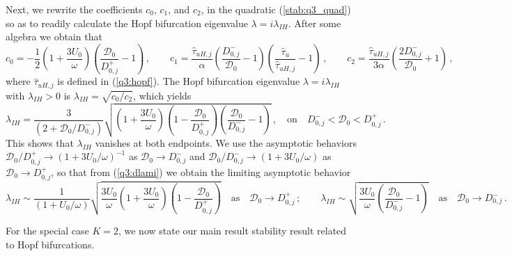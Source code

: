\documentclass{article}%
\newcommand{\dzjp}{D^{+}_{0,j}}
\newcommand{\dzjm}{D^{-}_{0,j}}
\begin{document}
Next, we rewrite the coefficients $c_0$, $c_1$, and $c_2$, in the
quadratic (\ref{stab:q3_quad}) so as to readily calculate the Hopf
bifurcation eigenvalue $\lambda=i\lambda_{IH}$. After some algebra we
obtain that
\begin{equation}\label{q3:new_c0c1c2}
  c_0 = -\frac{1}{2}\left(1+\frac{3U_0}{\omega}\right)
   \left( \frac{{\mathcal D}_0}{\dzjp}-1\right) \,, \qquad
  c_1 = \frac{\hat{\tau}_{uH,j}}{\alpha} \left( \frac{\dzjm}{{\mathcal D}_0}
  -1 \right)\left( \frac{\hat{\tau}_u}{\hat{\tau}_{uH,j}} -1 \right) \,,
  \qquad c_2 = \frac{\hat{\tau}_{uH,j}}{3\alpha}
  \left(\frac{2\dzjm}{{\mathcal D}_0} + 1 \right) \,,
\end{equation}
where $\hat{\tau}_{uH,j}$ is defined in (\ref{q3:hopf}). The Hopf bifurcation
eigenvalue $\lambda=i\lambda_{IH}$ with $\lambda_{IH}>0$ is 
$\lambda_{IH}=\sqrt{c_0/c_2}$, which yields
\begin{equation}\label{q3:dlami}
   \lambda_{IH}=\frac{3}{\left(2 + {{\mathcal D}_0/\dzjm}\right)} 
  \sqrt{ \left( 1 + \frac{3U_0}{\omega}\right) 
    \left(1 - \frac{{\mathcal D}_0}{\dzjp}\right)
\left(\frac{{\mathcal D}_0}{\dzjm} -1 \right)}\,, \quad \mbox{on} \quad
   \dzjm < {\mathcal D}_0 < \dzjp \,.
\end{equation}
This shows that $\lambda_{IH}$ vanishes at both endpoints.  We use the
asymptotic behaviors ${{\mathcal D}_0/\dzjp}\to
\left(1+{3U_0/\omega}\right)^{-1}$ as ${\mathcal D}_0\to \dzjm$ and
${{\mathcal D}_0/\dzjm}\to \left(1+{3U_0/\omega}\right)$ as ${\mathcal
  D}_0\to \dzjp$, so that from (\ref{q3:dlami}) we obtain the limiting
asymptotic behavior
\begin{equation}\label{q3:lim_val}
   \lambda_{IH}\sim \frac{1}{\left(1 + {U_0/\omega}\right)}
  \sqrt{ \frac{3U_0}{\omega} \left( 1 + \frac{3U_0}{\omega}\right) 
    \left(1 - \frac{{\mathcal D}_0}{\dzjp}\right)} \quad \mbox{as}
 \quad {\mathcal D}_0\to \dzjp\,; \qquad
  \lambda_{IH}\sim \sqrt{ \frac{3U_0}{\omega} 
  \left( \frac{{\mathcal D}_0}{\dzjm}-1\right)} \quad \mbox{as} \quad
  {\mathcal D}_0\to \dzjm \,.
\end{equation}

\noindent For the special case $K=2$, we now state our main result stability
result related to Hopf bifurcations.
\end{document}
